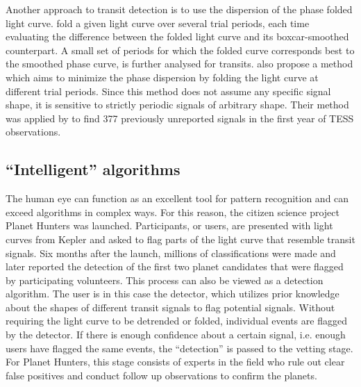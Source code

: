 Another approach to transit detection is to use the dispersion of the phase folded light curve. \cite{plavchan2008near} fold a given light curve over several trial periods, each time evaluating the difference between the folded light curve and its boxcar-smoothed counterpart. A small set of periods for which the folded curve corresponds best to the smoothed phase curve, is further analysed for transits. \cite{wheeler2019weird} also propose a method which aims to minimize the phase dispersion by folding the light curve at different trial periods. Since this method does not assume any specific signal shape, it is sensitive to strictly periodic signals of arbitrary shape. Their method was applied by \cite{chakraborty2020hundreds} to find 377 previously unreported signals in the first year of TESS observations.

\subsection{``Intelligent'' algorithms}

The human eye can function as an excellent tool for pattern recognition and can exceed algorithms in complex ways. For this reason, the citizen science project Planet Hunters was launched. Participants, or users, are presented with light curves from Kepler and asked to flag parts of the light curve that resemble transit signals. Six months after the launch, millions of classifications were made and later \cite{fischer2012planet} reported the detection of the first two planet candidates that were flagged by participating volunteers. This process can also be viewed as a detection algorithm. The user is in this case the detector, which utilizes prior knowledge about the shapes of different transit signals to flag potential signals. Without requiring the light curve to be detrended or folded, individual events are flagged by the detector. If there is enough confidence about a certain signal, i.e. enough users have flagged the same events, the ``detection'' is passed to the vetting stage. For Planet Hunters, this stage consists of experts in the field who rule out clear false positives and conduct follow up observations to confirm the planets. 

